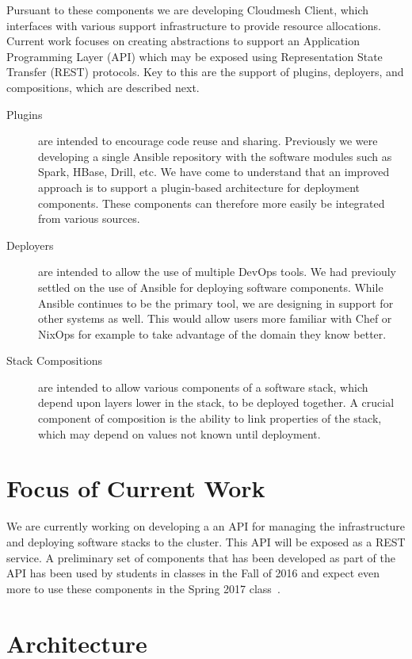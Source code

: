 \documentclass[9pt,twocolumn,twoside]{styles/osajnl}
\begin{document}
Pursuant to these components we are developing Cloudmesh Client, which
interfaces with various support infrastructure to provide resource
allocations. Current work focuses on creating abstractions to support
an Application Programming Layer (API) which may be exposed using
Representation State Transfer (REST) protocols. Key to this are the
support of plugins, deployers, and compositions, which are described
next.


\begin{description}
\item[Plugins] are intended to encourage code reuse and sharing.
  Previously we were developing a single Ansible repository with the
  software modules such as Spark, HBase, Drill, etc. We have come to
  understand that an improved approach is to support a plugin-based
  architecture for deployment components. These components can
  therefore more easily be integrated from various sources.
\item[Deployers] are intended to allow the use of multiple DevOps
  tools. We had previouly settled on the use of Ansible for deploying
  software components. While Ansible continues to be the primary tool,
  we are designing in support for other systems as well. This would
  allow users more familiar with Chef or NixOps for example to take
  advantage of the domain they know better.
\item[Stack Compositions] are intended to allow various components of
  a software stack, which depend upon layers lower in the stack, to be
  deployed together. A crucial component of composition is the ability
  to link properties of the stack, which may depend on values not
  known until deployment.
\end{description}



\section{Focus of Current Work}

We are currently working on developing a an API for managing the
infrastructure and deploying software stacks to the cluster. This API
will be exposed as a REST service. A preliminary set of components
that has been developed as part of the API has been used by students
in classes in the Fall of 2016 and expect even more to use these
components in the Spring 2017 class~\cite{www-i524}.


\section{Architecture}
\end{document}
